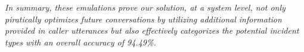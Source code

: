 
\textit{In summary, these emulations prove our solution, at a system level, not only piratically optimizes future conversations by utilizing additional information provided in caller utterances but also effectively categorizes the potential incident types with an overall accuracy of 94.49\%.}

